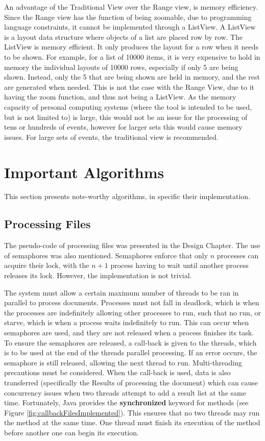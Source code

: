 \par An advantage of the Traditional View over the Range view, is memory efficiency. Since the Range view has the function of being zoomable, due to programming language constraints, it cannot be implemented through a ListView. A ListView is a layout data structure where objects of a list are placed row by row. The ListView is memory efficient. It only produces the layout for a row when it needs to be shown. For example, for a list of 10000 items, it is very expensive to hold in memory the individual layouts of 10000 rows, especially if only 5 are being shown. Instead, only the 5 that are being shown are held in memory, and the rest are generated when needed. This is not the case with the Range View, due to it having the zoom function, and thus not being a ListView. As the memory capacity of personal computing systems (where the tool is intended to be used, but is not limited to) is large, this would not be an issue for the processing of tens or hundreds of events, however for larger sets this would cause memory issues. For large sets of events, the traditional view is recommended.

\section{Important Algorithms}
\par This section presents note-worthy algorithms, in specific their implementation.
\subsection{Processing Files}
\par The pseudo-code of processing files was presented in the Design Chapter. The use of semaphores was also mentioned. Semaphores enforce that only $n$ processes can acquire their lock, with the $n+1$ process having to wait until another process releases its lock. However, the implementation is not trivial.

\par The system must allow a certain maximum number of threads to be ran in parallel to process documents. Processes must not fall in deadlock, which is when the processes are indefinitely allowing other processes to run, such that no run, or starve, which is when a process waits indefinitely to run. This can occur when semaphores are used, and they are not released when a process finishes its task. To ensure the semaphores are released, a call-back is given to the threads, which is to be used at the end of the threads parallel processing. If an error occurs, the semaphore is still released, allowing the next thread to run. Multi-threading precautions must be considered. When the call-back is used, data is also transferred (specifically the Results of processing the document) which can cause concurrency issues when two threads attempt to add a result list at the same time. Fortunately, Java provides the \textbf{synchronized} keyword for methods (see Figure \ref{fig:callbackFilesImplemented}). This ensures that no two threads may run the method at the same time. One thread must finish its execution of the method before another one can begin its execution.

